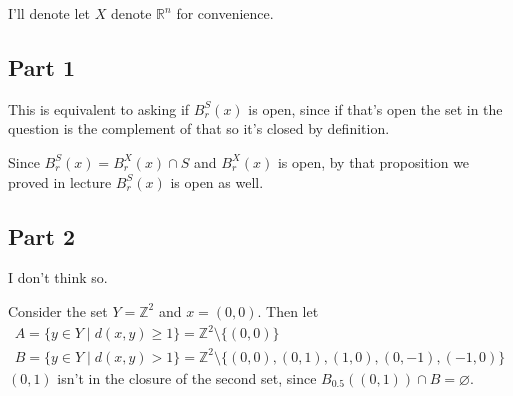 \documentclass[12pt]{article}
\newcommand{\R}{\mathbb{R}}
\newcommand{\Z}{\mathbb{Z}}
\begin{document}
I'll denote let $X$ denote $\R^n$ for convenience.

\subsection{Part 1}

This is equivalent to asking if $B^S_r(x)$ is open,
since if that's open the set in the question is the complement of that
so it's closed by definition.

Since $B^S_r(x)=B^X_r(x) \cap S$ and $B^X_r(x)$ is open,
by that proposition we proved in lecture $B^S_r(x)$ is open as well.

\subsection{Part 2}

I don't think so.

Consider the set $Y=\Z^2$ and $x=(0, 0)$.
Then let
\begin{gather*}
  A=\{y \in Y \mid d(x, y) \ge 1\}=\Z^2 \setminus \{(0, 0)\} \\
  B=\{y \in Y \mid d(x, y) > 1\} = \Z^2 \setminus \{(0, 0), (0, 1), (1, 0), (0, -1), (-1, 0)\}
\end{gather*}
$(0, 1)$ isn't in the closure of the second set, since $B_{0.5}((0, 1)) \cap B = \varnothing$.
\end{document}

